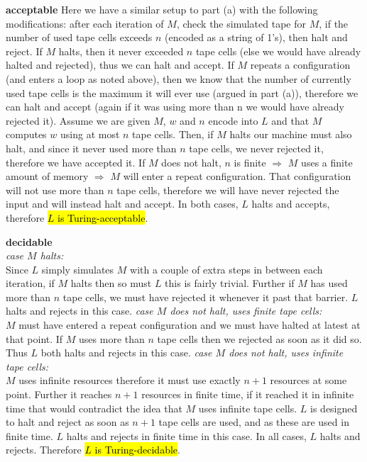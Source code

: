 \documentclass[12pt]{jhwhw}
\newcommand{\hlgreen}[1]{{\sethlcolor{lime}\hl{#1}}}
\begin{document}
	\textbf{acceptable}
		Here we have a similar setup to part (a) with the following modifications: after each iteration of $M$,
		check the simulated tape for $M$, if the number of used tape cells exceeds $n$ (encoded as a string of 1's),
		then halt and reject. If $M$ halts, then it never exceeded $n$ tape cells (else we would have already
		halted and rejected), thus we can halt and accept. If $M$ repeats a configuration (and enters a loop as noted
		above), then we know that the number of currently used tape cells is the maximum it will ever use (argued
		in part (a)), therefore we can halt and accept (again if it was using more than n we would have already
		rejected it).
		\bigbreak
		Assume we are given $M$, $w$ and $n$ encode into $L$ and that $M$ computes $w$ using at most $n$ tape
		cells. Then, if $M$ halts our machine must also halt, and since it never used more than $n$ tape cells,
		we never rejected it, therefore we have accepted it. If $M$ does not halt, $n$ is finite $\Rightarrow$
		$M$ uses a finite amount of memory $\Rightarrow$ $M$ will enter a repeat configuration. That configuration
		will not use more than $n$ tape cells, therefore we will have never rejected the input and will instead
		halt and accept. In both cases, $L$ halts and accepts, therefore \hlgreen{$L$ is Turing-acceptable}.

	\bigbreak
	\textbf{decidable} \\
		\textit{case $M$ halts:} \\
			Since $L$ simply simulates $M$ with a couple of extra steps in between each iteration,
			if $M$ halts then so must $L$ this is fairly trivial. Further if $M$ has used more
			than $n$ tape cells, we must have rejected it whenever it past that barrier.
			$L$ halts and rejects in this case.
		\bigbreak
		\textit{case $M$ does not halt, uses finite tape cells:} \\
			$M$ must have entered a repeat configuration and we must have halted at latest at that point.
			If $M$ uses more than $n$ tape cells then we rejected as soon as it did so. Thus $L$ both
			halts and rejects in this case.
		\bigbreak
		\textit{case $M$ does not halt, uses infinite tape cells:} \\
			$M$ uses infinite resources therefore it must use exactly $n+1$ resources at some point.
			Further it reaches $n+1$ resources in finite time, if it reached it in infinite time that
			would contradict the idea that $M$ uses infinite tape cells. $L$ is designed to halt
			and reject as soon as $n+1$ tape cells are used, and as these are used in finite time.
			$L$ halts and rejects in finite time in this case.
		\bigbreak
		In all cases, $L$ halts and rejects. Therefore \hlgreen{$L$ is Turing-decidable}.
\end{document}
